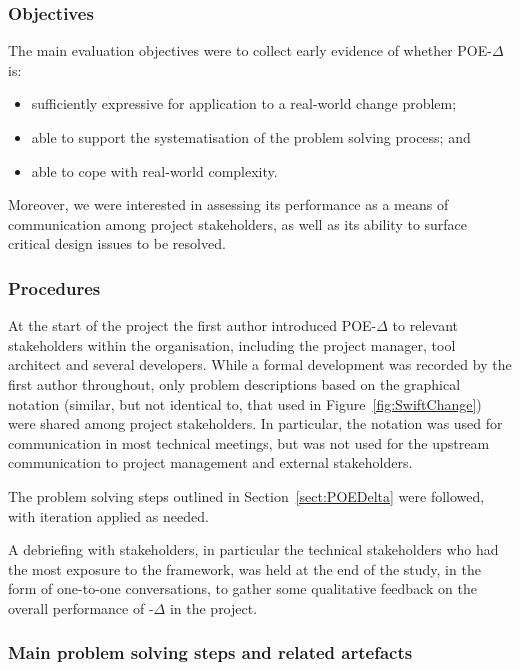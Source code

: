 \documentclass[runningheads,a4paper]{llncs}
\begin{document}
\subsubsection{Objectives}

The main evaluation objectives were to collect early evidence of whether POE-$\Delta$ is:
\begin{itemize}
\item sufficiently expressive for application to a real-world change problem;
\item able to support the systematisation of the problem solving process; and
\item able to cope with real-world complexity.
\end{itemize}

Moreover, we were interested in assessing its performance as a means of communication among project stakeholders, as well as its ability to surface critical design issues to be resolved.

\subsubsection{Procedures}

 At the start of the project the first author introduced POE-$\Delta$ to relevant stakeholders within the organisation, including the project manager, tool architect and several developers. While a formal development was recorded by the first author throughout, only problem descriptions based on the graphical notation (similar, but not identical to, that used in Figure~\ref{fig:SwiftChange}) were shared among project stakeholders. In particular, the notation was used for communication in most technical meetings, but was not used for the upstream communication to project management and external stakeholders.

 The problem solving steps outlined in Section~\ref{sect:POEDelta} were followed, with iteration applied as needed. 
 
 A debriefing with stakeholders, in particular the technical stakeholders who had the most exposure to the framework, was held at the end of the study, in the form of one-to-one conversations, to gather some qualitative feedback on the overall performance of \POE{}-$\Delta$ in the project.  
 
\subsubsection{Main problem solving steps and related artefacts}
\end{document}
